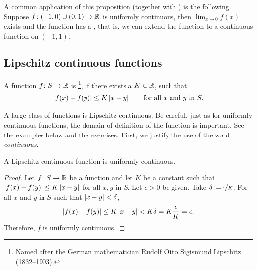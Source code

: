 A common application of this proposition (together with
)
is the following.
Suppose $f \colon (-1,0) \cup (0,1) \to {\mathbb{R}}$ is uniformly continuous,
then $\lim_{x\to 0} f(x)$ exists and the function
has a \emph{}, that is,
we can extend the function to a continuous function on $(-1,1)$.


\subsection{Lipschitz continuous functions}

\begin{defn}
A function $f \colon S \to {\mathbb{R}}$
is \emph{}%
\footnote{Named after the German mathematician
\href{https://en.wikipedia.org/wiki/Rudolf_Lipschitz}{Rudolf Otto Sigismund Lipschitz}
(1832--1903).}, if there exists a $K \in {\mathbb{R}}$, such that
\begin{equation*}
\left\lvert {f(x)-f(y)} \right\rvert \leq K \left\lvert {x-y} \right\rvert 
\qquad \text{for all } x \text{ and } y \text{ in } S.
\end{equation*}
\end{defn}

A large class of functions is Lipschitz continuous.  Be careful, just as
for uniformly continuous functions, the
domain of definition of the function is important.  See the examples below
and the exercises.  First, we justify the use of the word \emph{continuous}.

\begin{prop}
A Lipschitz continuous function is uniformly continuous.
\end{prop}

\begin{proof}
Let $f \colon S \to {\mathbb{R}}$ be a function and let $K$ be a constant such that
$\left\lvert {f(x)-f(y)} \right\rvert \leq K \left\lvert {x-y} \right\rvert$
for all $x, y$ in $S$.
Let $\epsilon > 0$ be given.  Take $\delta :=
\nicefrac{\epsilon}{K}$.
For all $x$ and $y$ in $S$ such that
$\left\lvert {x-y} \right\rvert < \delta$,
\begin{equation*}
\left\lvert {f(x)-f(y)} \right\rvert \leq K \left\lvert {x-y} \right\rvert < K \delta = K \frac{\epsilon}{K} =
\epsilon .
\end{equation*}
Therefore, $f$ is uniformly continuous.
\end{proof}

